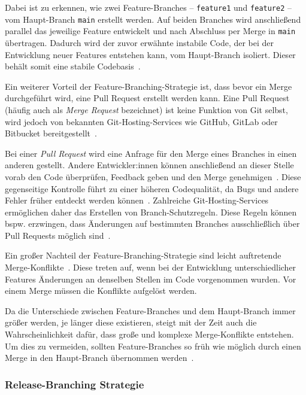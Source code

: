 Dabei ist zu erkennen, wie zwei Feature\hyp Branches -- \texttt{feature1} und \texttt{feature2} -- vom Haupt\hyp Branch \texttt{main} erstellt werden. Auf beiden Branches wird anschließend parallel das jeweilige Feature entwickelt und nach Abschluss per Merge in \texttt{main} übertragen. Dadurch wird der zuvor erwähnte instabile Code, der bei der Entwicklung neuer Features entstehen kann, vom Haupt\hyp Branch isoliert. Dieser behält somit eine stabile Codebasis~\cite{sorin_dumitrescu_what_2021}.

Ein weiterer Vorteil der Feature\hyp Branching\hyp Strategie ist, dass bevor ein Merge durchgeführt wird, eine Pull Request erstellt werden kann. Eine Pull Request (häufig auch als \emph{Merge Request} bezeichnet) ist keine Funktion von Git selbst, wird jedoch von bekannten Git\hyp Hosting\hyp Services wie GitHub, GitLab oder Bitbucket bereitgestellt~\cite{heddings_what_2021}.

Bei einer \emph{Pull Request} wird eine Anfrage für den Merge eines Branches in einen anderen gestellt. Andere Entwickler:innen können anschließend an dieser Stelle vorab den Code überprüfen, Feedback geben und den Merge genehmigen~\cite{atlassian_feature_2023}. Diese gegenseitige Kontrolle führt zu einer höheren Codequalität, da Bugs und andere Fehler früher entdeckt werden können~\cite{pullrequest_why_2023}. Zahlreiche Git\hyp Hosting\hyp Services ermöglichen daher das Erstellen von Branch\hyp Schutzregeln. Diese Regeln können bspw. erzwingen, dass Änderungen auf bestimmten Branches ausschließlich über Pull Requests möglich sind~\cite{benvegnu_best_2020}.

Ein großer Nachteil der Feature\hyp Branching\hyp Strategie sind leicht auftretende Merge\hyp Konflikte~\cite{sorin_dumitrescu_what_2021}. Diese treten auf, wenn bei der Entwicklung unterschiedlicher Features Änderungen an denselben Stellen im Code vorgenommen wurden. Vor einem Merge müssen die Konflikte aufgelöst werden.

Da die Unterschiede zwischen Feature\hyp Branches und dem Haupt\hyp Branch immer größer werden, je länger diese existieren, steigt mit der Zeit auch die Wahrscheinlichkeit dafür, dass große und komplexe Merge\hyp Konflikte entstehen. Um dies zu vermeiden, sollten Feature\hyp Branches so früh wie möglich durch einen Merge in den Haupt\hyp Branch übernommen werden~\cite{sorin_dumitrescu_what_2021}.


\subsubsection{Release\hyp Branching Strategie}

